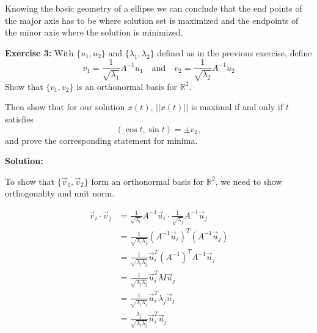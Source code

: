 \documentclass[12pt]{article}
\begin{document}
\noindent{} Knowing the basic geometry of a ellipse we can conclude that the end points of the major axis has to be where solution set is maximized and the endpoints of the minor axis where the solution is minimized.

\vspace{1cm}

\noindent \textbf{Exercise 3:} With $\{u_{1},u_{2}\}$ and $\{\lambda_{1},\lambda_{2}\}$ defined as in the previous exercise, define
\begin{equation}
    v_{1}=\frac{1}{\sqrt{\lambda_{1}}}A^{-1}u_{1} \quad \text{and} \quad v_{2}=\frac{1}{\sqrt{\lambda_{2}}}A^{-1}u_{2} \tag{0.9}
\end{equation}
Show that $\{v_{1},v_{2}\}$ is an orthonormal basis for $\mathbb{R}^{2}$.

\noindent{}Then show that for our solution $x(t)$, $||x(t)||$ is maximal if and only if $t$ satisfies
\[
    (\cos t,\sin t)=\pm v_{2},
\]
and prove the corresponding statement for minima.

\vspace{1cm}

\noindent{}\textbf{Solution:}

\noindent{}To show that $\{\vec{v}_1, \vec{v}_2\}$ form an orthonormal basis for $\mathbb{R}^2$, we need to show orthogonality and unit norm.

\begin{align*}
    \vec{v}_i \cdot{\vec{v}_j} & = \tfrac{1}{\sqrt{\lambda_{i}}}A^{-1}\vec{u}_{i} \cdot{} \tfrac{1}{\sqrt{\lambda_{j}}}A^{-1}\vec{u}_{j} \\
                               & = \tfrac{1}{\sqrt{\lambda_{i}\lambda_{j}}} (A^{-1}\vec{u}_{i})^T(A^{-1}\vec{u}_{j})                     \\
                               & = \tfrac{1}{\sqrt{\lambda_{i}\lambda_{j}}} \vec{u}_{i}^T(A^{-1})^TA^{-1}\vec{u}_{j}                     \\
                               & = \tfrac{1}{\sqrt{\lambda_{i}\lambda_{j}}} \vec{u}_{i}^TM\vec{u}_{j}                                    \\
                               & = \tfrac{1}{\sqrt{\lambda_{i}\lambda_{j}}} \vec{u}_{i}^T\lambda_{j}\vec{u}_{j}                          \\
                               & = \tfrac{\lambda_{j}}{\sqrt{\lambda_{i}\lambda_{j}}} \vec{u}_{i}^T\vec{u}_{j}                           \\
\end{align*}
\end{document}
